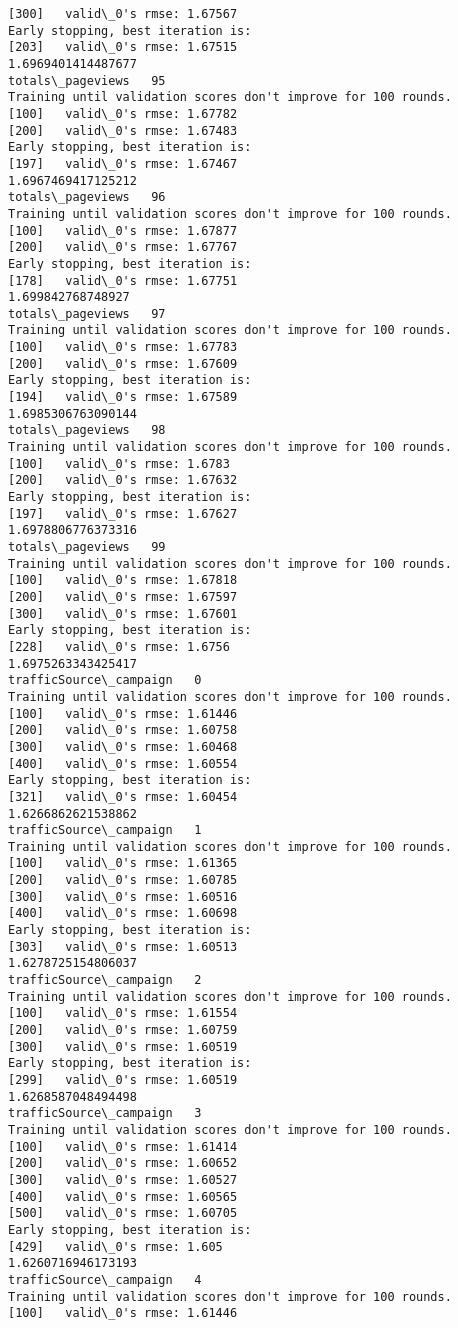 \documentclass[11pt]{article}
\begin{document}
\begin{Verbatim}[commandchars=\\\{\}]
[300]	valid\_0's rmse: 1.67567
Early stopping, best iteration is:
[203]	valid\_0's rmse: 1.67515
1.6969401414487677
totals\_pageviews   95
Training until validation scores don't improve for 100 rounds.
[100]	valid\_0's rmse: 1.67782
[200]	valid\_0's rmse: 1.67483
Early stopping, best iteration is:
[197]	valid\_0's rmse: 1.67467
1.6967469417125212
totals\_pageviews   96
Training until validation scores don't improve for 100 rounds.
[100]	valid\_0's rmse: 1.67877
[200]	valid\_0's rmse: 1.67767
Early stopping, best iteration is:
[178]	valid\_0's rmse: 1.67751
1.699842768748927
totals\_pageviews   97
Training until validation scores don't improve for 100 rounds.
[100]	valid\_0's rmse: 1.67783
[200]	valid\_0's rmse: 1.67609
Early stopping, best iteration is:
[194]	valid\_0's rmse: 1.67589
1.6985306763090144
totals\_pageviews   98
Training until validation scores don't improve for 100 rounds.
[100]	valid\_0's rmse: 1.6783
[200]	valid\_0's rmse: 1.67632
Early stopping, best iteration is:
[197]	valid\_0's rmse: 1.67627
1.6978806776373316
totals\_pageviews   99
Training until validation scores don't improve for 100 rounds.
[100]	valid\_0's rmse: 1.67818
[200]	valid\_0's rmse: 1.67597
[300]	valid\_0's rmse: 1.67601
Early stopping, best iteration is:
[228]	valid\_0's rmse: 1.6756
1.6975263343425417
trafficSource\_campaign   0
Training until validation scores don't improve for 100 rounds.
[100]	valid\_0's rmse: 1.61446
[200]	valid\_0's rmse: 1.60758
[300]	valid\_0's rmse: 1.60468
[400]	valid\_0's rmse: 1.60554
Early stopping, best iteration is:
[321]	valid\_0's rmse: 1.60454
1.6266862621538862
trafficSource\_campaign   1
Training until validation scores don't improve for 100 rounds.
[100]	valid\_0's rmse: 1.61365
[200]	valid\_0's rmse: 1.60785
[300]	valid\_0's rmse: 1.60516
[400]	valid\_0's rmse: 1.60698
Early stopping, best iteration is:
[303]	valid\_0's rmse: 1.60513
1.6278725154806037
trafficSource\_campaign   2
Training until validation scores don't improve for 100 rounds.
[100]	valid\_0's rmse: 1.61554
[200]	valid\_0's rmse: 1.60759
[300]	valid\_0's rmse: 1.60519
Early stopping, best iteration is:
[299]	valid\_0's rmse: 1.60519
1.6268587048494498
trafficSource\_campaign   3
Training until validation scores don't improve for 100 rounds.
[100]	valid\_0's rmse: 1.61414
[200]	valid\_0's rmse: 1.60652
[300]	valid\_0's rmse: 1.60527
[400]	valid\_0's rmse: 1.60565
[500]	valid\_0's rmse: 1.60705
Early stopping, best iteration is:
[429]	valid\_0's rmse: 1.605
1.6260716946173193
trafficSource\_campaign   4
Training until validation scores don't improve for 100 rounds.
[100]	valid\_0's rmse: 1.61446

\end{Verbatim}
\end{document}

